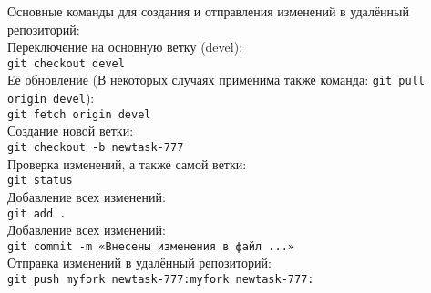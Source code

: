 Основные команды для создания и отправления изменений в удалённый репозиторий:
\\Переключение на основную ветку (devel):
\\ \texttt{git checkout devel}
\\ \quad Её обновление (В некоторых случаях применима также команда: \texttt{git pull origin devel}):
\\ \texttt{git fetch origin devel}
\\ \quad Создание новой ветки:
\\ \texttt{git checkout -b newtask-777}
\\ \quad Проверка изменений, а также самой ветки:
\\ \texttt{git status}
\\ \quad Добавление всех изменений:
\\ \texttt{git add .}
\\ \quad Добавление всех изменений:
\\ \texttt{git commit -m «Внесены изменения в файл ...»}
\\ \quad Отправка изменений в удалённый репозиторий:
\\ \texttt{git push myfork newtask-777:myfork newtask-777:}
